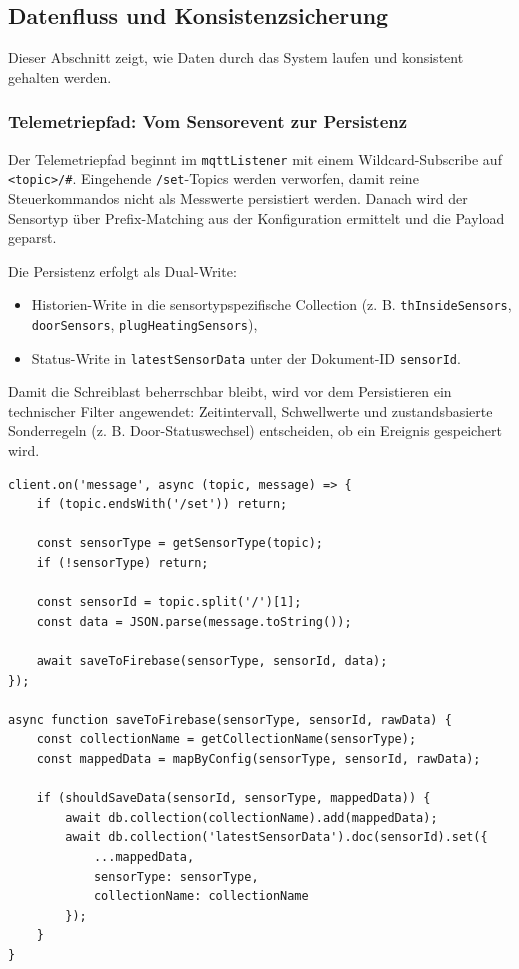 \subsection{Datenfluss und Konsistenzsicherung}

Dieser Abschnitt zeigt, wie Daten durch das System laufen und konsistent gehalten werden.

\subsubsection{Telemetriepfad: Vom Sensorevent zur Persistenz}

Der Telemetriepfad beginnt im \texttt{mqttListener} mit einem Wildcard-Subscribe auf \texttt{<topic>/\#}. Eingehende \texttt{/set}-Topics werden verworfen, damit reine Steuerkommandos nicht als Messwerte persistiert werden. Danach wird der Sensortyp über Prefix-Matching aus der Konfiguration ermittelt und die Payload geparst.

Die Persistenz erfolgt als Dual-Write:

\begin{itemize}
    \item Historien-Write in die sensortypspezifische Collection (z. B. \texttt{thInsideSensors}, \texttt{doorSensors}, \texttt{plugHeatingSensors}),
    \item Status-Write in \texttt{latestSensorData} unter der Dokument-ID \texttt{sensorId}.
\end{itemize}

Damit die Schreiblast beherrschbar bleibt, wird vor dem Persistieren ein technischer Filter angewendet: Zeitintervall, Schwellwerte und zustandsbasierte Sonderregeln (z. B. Door-Statuswechsel) entscheiden, ob ein Ereignis gespeichert wird.

\begin{lstlisting}[caption={Telemetriepfad im mqttListener},label={lst:db:flow:telemetry-path},basicstyle=\ttfamily\small,breaklines=true,breakatwhitespace=false,columns=fullflexible]
client.on('message', async (topic, message) => {
    if (topic.endsWith('/set')) return;

    const sensorType = getSensorType(topic);
    if (!sensorType) return;

    const sensorId = topic.split('/')[1];
    const data = JSON.parse(message.toString());

    await saveToFirebase(sensorType, sensorId, data);
});

async function saveToFirebase(sensorType, sensorId, rawData) {
    const collectionName = getCollectionName(sensorType);
    const mappedData = mapByConfig(sensorType, sensorId, rawData);

    if (shouldSaveData(sensorId, sensorType, mappedData)) {
        await db.collection(collectionName).add(mappedData);
        await db.collection('latestSensorData').doc(sensorId).set({
            ...mappedData,
            sensorType: sensorType,
            collectionName: collectionName
        });
    }
}
\end{lstlisting}

